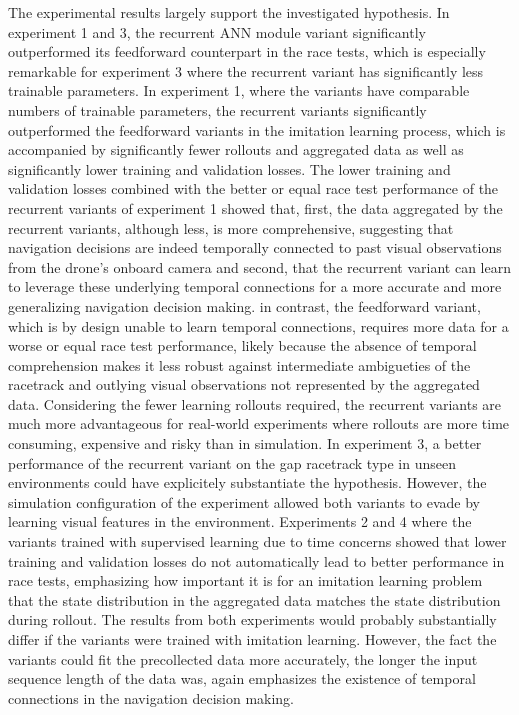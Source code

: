 The experimental results largely support the investigated hypothesis.
In experiment 1 and 3, the recurrent ANN module variant significantly outperformed its feedforward counterpart 
in the race tests, which is especially remarkable for experiment 3
where the recurrent variant has significantly less trainable parameters.
In experiment 1, where the variants have comparable numbers of trainable parameters,
the recurrent variants significantly outperformed the feedforward variants in the imitation learning process,
which is accompanied by significantly fewer rollouts and aggregated data 
as well as significantly lower training and validation losses.
The lower training and validation losses combined with the better or equal race test performance of
the recurrent variants of experiment 1 showed that, first, 
the data aggregated by the recurrent variants, although less, is more comprehensive,
suggesting that navigation decisions are indeed temporally connected 
to past visual observations from the drone's onboard camera
and second, that the recurrent variant can learn to leverage these 
underlying temporal connections for a more accurate and more generalizing navigation decision making.
in contrast, the feedforward variant, which is by design unable to learn temporal connections,
requires more data for a worse or equal race test performance,
likely because the absence of temporal comprehension makes it 
less robust against intermediate ambigueties of the racetrack 
and outlying visual observations not represented by the aggregated data.
Considering the fewer learning rollouts required,
the recurrent variants are much more advantageous for real-world experiments
where rollouts are more time consuming, expensive and risky than in simulation.
In experiment 3, a better performance of the recurrent variant on the gap racetrack type 
in unseen environments could have explicitely substantiate the hypothesis.
However, the simulation configuration of the experiment allowed both variants
to evade by learning visual features in the environment.
Experiments 2 and 4 where the variants trained with supervised learning due to time concerns
showed that lower training and validation losses 
do not automatically lead to better performance in race tests, 
emphasizing how important it is for an imitation learning problem
that the state distribution in the aggregated data matches the state distribution during rollout.
The results from both experiments would probably substantially differ 
if the variants were trained with imitation learning.
However, the fact the variants could fit the precollected data more accurately,
the longer the input sequence length of the data was,
again emphasizes the existence of temporal connections in the navigation decision making.

